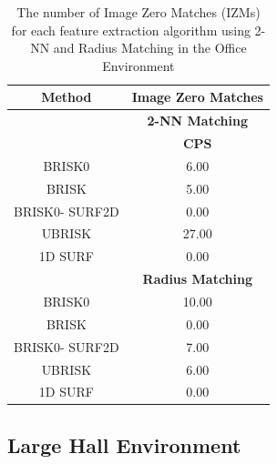 \begin{table}
\centering
\caption{The number of Image Zero Matches (IZMs) for each feature extraction
algorithm using 2-NN and Radius Matching in the Office Environment}
\begin{tabular}{|c|c|}
\hline 
\textbf{Method} & \multicolumn{1}{c|}{\textbf{Image Zero Matches}}\tabularnewline
\hline 
 & \multicolumn{1}{c|}{\textbf{2-NN Matching}}\tabularnewline
\hline 
 & \textbf{CPS}\tabularnewline
\hline 
\hline 
BRISK0 & 6.00\tabularnewline
\hline 
BRISK & 5.00\tabularnewline
\hline 
BRISK0- SURF2D & 0.00\tabularnewline
\hline 
UBRISK & 27.00\tabularnewline
\hline 
1D SURF & 0.00\tabularnewline
\hline 
 & \multicolumn{1}{c|}{\textbf{Radius Matching}}\tabularnewline
\hline 
BRISK0 & 10.00\tabularnewline
\hline 
BRISK & 0.00\tabularnewline
\hline 
BRISK0- SURF2D & 7.00\tabularnewline
\hline 
UBRISK & 6.00\tabularnewline
\hline 
1D SURF & 0.00\tabularnewline
\hline 
\end{tabular}
\label{app:oe_izm}
\end{table}


\subsection{Large Hall Environment}
\label{app:lh}


